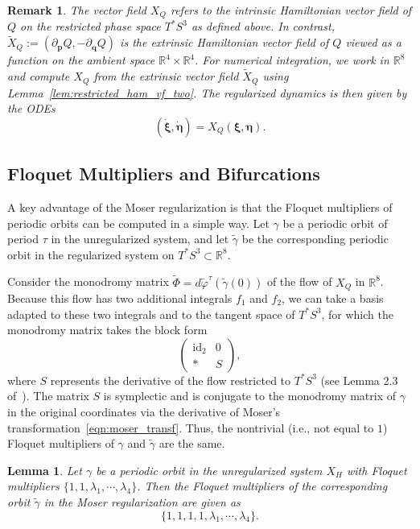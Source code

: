 \documentclass[pdflatex,sn-mathphys-ay]{sn-jnl}%
\theoremstyle{thmstyleone}%
\newtheorem{lemma}[theorem]{Lemma}%
\theoremstyle{thmstyletwo}%
\newtheorem{remark}{Remark}%
\theoremstyle{thmstylethree}%
\renewcommand{\phi}{\varphi}
\begin{document}
\begin{remark}
The vector field $X_Q$ refers to the \emph{intrinsic} Hamiltonian vector field of $Q$ on the restricted phase space $T^*S^3$ as defined above. In contrast, $\tilde{X}_Q := (\partial_{\mathbf{p}} Q, -\partial_{\mathbf{q}} Q)$ is the \emph{extrinsic} Hamiltonian vector field of $Q$ viewed as a function on the ambient space $\mathbb{R}^4\times \mathbb{R}^4$.
For numerical integration, we work in $\mathbb{R}^8$ and compute $X_Q$ from the extrinsic vector field $\tilde{X}_Q$ using Lemma~\ref{lem:restricted_ham_vf_two}.
The regularized dynamics is then given by the ODEs
\begin{equation*}
    (\dot{\boldsymbol{\xi}}, \dot{\boldsymbol{\eta}}) = X_Q(\boldsymbol{\xi}, \boldsymbol{\eta}).
\end{equation*}
\end{remark}


\subsection{Floquet Multipliers and Bifurcations}
A key advantage of the Moser regularization is that the Floquet multipliers of periodic orbits can be computed in a simple way.  
Let $\gamma$ be a periodic orbit of period $\tau$ in the unregularized system, and let $\tilde{\gamma}$ be the corresponding periodic orbit in the regularized system on $T^*S^3\subset \mathbb{R}^8$.

Consider the monodromy matrix $\tilde{\Phi} = d\tilde{\phi}^\tau(\tilde{\gamma}(0))$ of the flow of $X_Q$ in $\mathbb{R}^8$.  
Because this flow has two additional integrals $f_1$ and $f_2$, we can take a basis adapted to these two integrals and to the tangent space of $T^*S^3$, for which the monodromy matrix takes the block form
\[
\left(
\begin{array}{c|c}
\text{id}_2 & 0 \\\hline
* & S
\end{array}
\right),
\]
where $S$ represents the derivative of the flow restricted to $T^*S^3$ (see Lemma 2.3 of~\cite{moser_zehnder_notes_2005}).  
The matrix $S$ is symplectic and is conjugate to the monodromy matrix of $\gamma$ in the original coordinates via the derivative of Moser's transformation~\eqref{eqn:moser_transf}. Thus, the nontrivial (i.e., not equal to $1$) Floquet multipliers of $\gamma$ and $\tilde{\gamma}$ are the same.

\begin{lemma}
\label{lem:moser-floquet}
Let $\gamma$ be a periodic orbit in the unregularized system $X_H$ with Floquet multipliers $\{1, 1, \lambda_1, \cdots, \lambda_4\}$. Then the Floquet multipliers of the corresponding orbit $\tilde{\gamma}$ in the Moser regularization are given as
\[\{1, 1, 1, 1, \lambda_1, \cdots, \lambda_4\}.\]
\end{lemma}
\end{document}
